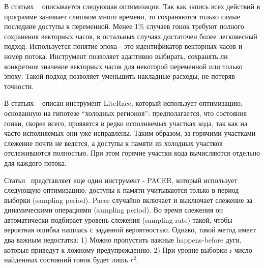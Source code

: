 В статьях ~\cite{Flanagan:2009:PLDI, Flanagan:2009} описывается следующая оптимизация.
Так как запись всех действий в программе занимает слишком много времени, то сохраняются только самые последние доступы к переменной.
Менее 1\% случаев гонок требуют полного сохранения векторных часов, в остальных случаях достаточен более легковесный подход.
Используется понятие эпоха - это идентификатор векторных часов и номер потока.
Инструмент позволяет адаптивно выбирать, сохранять ли конкретное значение векторных часов для некоторой переменной или только эпоху.
Такой подход позволяет уменьшить накладные расходы, не потеряв точности.  

В статьях ~\cite{Marino:2009:PLDI, Marino:2009} описан инструмент LiteRace, который использует оптимизацию, основанную на гипотезе “холодных регионов”: предполагается, что состояния гонки, скорее всего, проявятся в редко исполняемых участках кода, так как на часто исполняемых они уже исправлены.
Таким образом, за горячими участками слежение почти не ведется, а доступы к памяти из холодных участков отслеживаются полностью.
При этом горячие участки кода вычисляются отдельно для каждого потока.

Статьи~\cite{Bond:2010:PLDI,Bond:2010} представляет еще один инструмент - PACER, который использует следующую оптимизацию: доступы к памяти учитываются только в период выборки (sampling period).
Pacer случайно включает и выключает слежение за динамическими операциями (sampling period).
Во время слежения он автоматически подбирает уровень слежения (sampling rate) такой, чтобы вероятная ошибка нашлась с заданной вероятностью.
Однако, такой метод имеет два важным недостатка:
1) Можно пропустить важные happens-before дуги, которые приведут к ложному предупреждению.
2) При уровне выборки r число найденных состояний гонок будет лишь $r^2$. 

